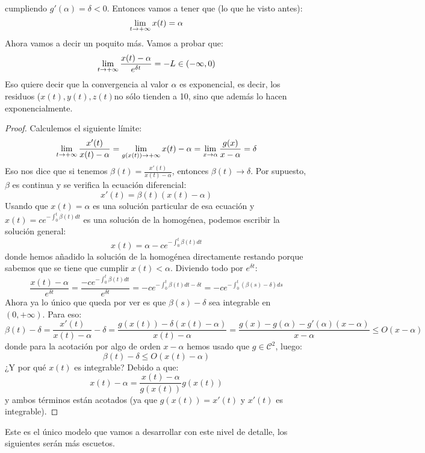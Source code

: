 \begin{example}
cumpliendo $g'(\alpha)=\delta<0$. Entonces vamos a tener que (lo que he visto antes):
\[
\displaystyle\lim_{  t  \to +\infty }  x(t) =\alpha
\]
Ahora vamos a decir un poquito más. Vamos a probar que:
\[
\displaystyle\lim_{  t  \to +\infty }  \frac{x(t)-\alpha}{e^{\delta t}} =-L\in(-\infty,0)
\]
Eso quiere decir que la convergencia al valor $\alpha$ es exponencial, es decir, los residuos ($x(t),y(t),z(t)$no sólo tienden a 10, sino que además lo hacen exponencialmente.
\begin{proof}
Calculemos el siguiente límite:
\[
\displaystyle\lim_{  t  \to +\infty }  \frac{x'(t)}{x(t)-\alpha} =\displaystyle\lim_{  g(x(t))  \to +\infty }  x(t)-\alpha =\displaystyle\lim_{ x \to \alpha } \frac{g(x)}{x-\alpha}=\delta
\]
Eso nos dice que si tenemos $\beta(t)=\frac{x'(t)}{x(t)-\alpha}$, entonces $\beta(t)\longrightarrow \delta$. Por supuesto, $\beta$ es continua y se verifica la ecuación diferencial:
\[
x'(t)= \beta(t)(x(t)-\alpha)
\]
Usando que $x(t)=\alpha$ es una solución particular de esa ecuación y $x(t)=ce^{-\int_0^t\beta(t)dt}$ es una solución de la homogénea, podemos escribir la solución general:
\[
x(t)=\alpha-ce^{-\int_0^t\beta(t)dt}
\]
donde hemos añadido la solución de la homogénea directamente restando porque sabemos que se tiene que cumplir $x(t)<\alpha$. Diviendo todo por $e^{\delta t}$:
\[
\frac{x(t)-\alpha}{e^{\delta t}}=\frac{-ce^{-\int_0^t\beta(t)dt}}{e^{\delta t}}=-ce^{-\int_0^t\beta(t)dt-\delta t}=-ce^{-\int_0^t\left(\beta(s)-\delta \right)ds}
\]
Ahora ya lo único que queda por ver es que $\beta(s)-\delta$ sea integrable en $(0,+\infty)$. Para eso:
\[
\beta(t)-\delta=\frac{x'(t)}{x(t)-\alpha}-\delta=\frac{g(x(t))-\delta(x(t)-\alpha)}{x(t)-\alpha}=\frac{g(x)-g(\alpha)-g'(\alpha)(x-\alpha) }{x-\alpha}\leq O(x-\alpha)
\]
donde para la acotación por algo de orden $x-\alpha$ hemos usado que $g\in\mathcal{C}^2$, luego:
\[
\beta(t)-\delta\leq O(x(t)-\alpha)
\]
¿Y por qué $x(t)$ es integrable? Debido a que:
\[
x(t)-\alpha = \frac{x(t)-\alpha}{g(x(t))}g(x(t))
\]
y ambos términos están acotados (ya que $g(x(t))=x'(t)$ y $x'(t)$ es integrable).
\end{proof}

Este es el único modelo que vamos a desarrollar con este nivel de detalle, los siguientes serán más escuetos.
\end{example}
